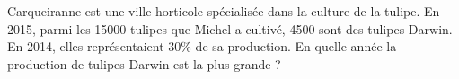 
Carqueiranne est une ville horticole spécialisée dans la culture de la tulipe. En 2015, parmi les 15000 tulipes que Michel a cultivé, 4500 sont des tulipes Darwin. En 2014, elles représentaient 30\% de sa production. En quelle année la production de tulipes Darwin est la plus grande ?







